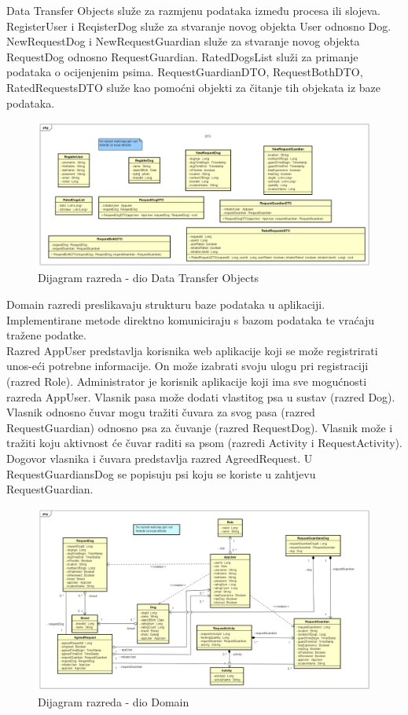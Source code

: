 		
			Data Transfer Objects služe za razmjenu podataka između procesa ili slojeva.\\
			RegisterUser i ReqisterDog služe za stvaranje novog objekta User odnosno Dog.
			NewRequestDog i NewRequestGuardian služe za stvaranje novog objekta RequestDog odnosno RequestGuardian.
			RatedDogsList služi za primanje podataka o ocijenjenim psima.
			RequestGuardianDTO, RequestBothDTO, RatedRequestsDTO služe kao pomoćni objekti za čitanje tih objekata iz baze podataka.
			\eject
			
			\begin{figure}[htb]
				\centering
				\includegraphics[width=15cm]{slike/dijagram_razreda_DTO}
				\caption{Dijagram razreda - dio Data Transfer Objects}
				\label{fig:Class-Diagram}
			\end{figure}
		
		
			Domain razredi preslikavaju strukturu baze podataka u aplikaciji. Implementirane metode direktno komuniciraju s bazom podataka te vraćaju tražene podatke.\\
			Razred AppUser predstavlja korisnika web aplikacije koji se može registrirati unos-eći potrebne informacije. On može izabrati svoju ulogu pri registraciji (razred Role). Administrator je korisnik aplikacije koji ima sve mogućnosti razreda AppUser. Vlasnik pasa može dodati vlastitog psa u sustav (razred Dog). Vlasnik odnosno čuvar mogu tražiti čuvara za svog pasa (razred RequestGuardian) odnosno psa za čuvanje (razred RequestDog). Vlasnik može i tražiti koju aktivnost će čuvar raditi sa psom (razredi Activity i RequestActivity). Dogovor vlasnika i čuvara predstavlja razred AgreedRequest. U RequestGuardiansDog se popisuju psi koju se koriste u zahtjevu RequestGuardian.
			
			\begin{figure}[htb]
				\centering
				\includegraphics[width=15cm]{slike/class_diagram_domain}
				\caption{Dijagram razreda - dio Domain}
				\label{fig:Class-Diagram}
			\end{figure}
	
